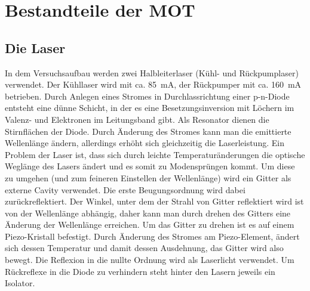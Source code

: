 \documentclass[12pt,a4paper]{article}
\begin{document}
\section{Bestandteile der MOT}
  \subsection{Die Laser}
    In dem Versuchsaufbau werden zwei Halbleiterlaser (Kühl- und Rückpumplaser)
    verwendet. Der Kühllaser wird mit ca. \SI{85}{\mA}, der Rückpumper mit ca.
    \SI{160}{\mA} betrieben. Durch Anlegen eines Stromes in Durchlassrichtung
    einer p-n-Diode entsteht eine dünne Schicht, in der es eine Besetzungsinversion
    mit Löchern im Valenz- und Elektronen im Leitungsband gibt. Als Resonator
    dienen die Stirnflächen der Diode. Durch Änderung des Stromes kann man die
    emittierte Wellenlänge ändern, allerdings erhöht sich gleichzeitig die
    Laserleistung. Ein Problem der Laser ist, dass sich durch leichte
    Temperaturänderungen die optische Weglänge des Lasers ändert und es somit zu
    Modensprüngen kommt. Um diese zu umgehen (und zum feineren Einstellen der
    Wellenlänge) wird ein Gitter als externe Cavity verwendet. Die erste
    Beugungsordnung wird dabei zurückreflektiert. Der Winkel, unter dem der Strahl
    von Gitter reflektiert wird ist von der Wellenlänge abhängig, daher kann man
    durch drehen des Gitters eine Änderung der Wellenlänge erreichen. Um das Gitter
    zu drehen ist es auf einem Piezo-Kristall befestigt. Durch Änderung des Stromes
    am Piezo-Element, ändert sich dessen Temperatur und damit dessen Ausdehnung, das
    Gitter wird also bewegt. Die Reflexion in die nullte Ordnung wird als Laserlicht
    verwendet. Um Rückreflexe in die Diode zu verhindern steht hinter den Lasern
    jeweils ein Isolator.
\end{document}
